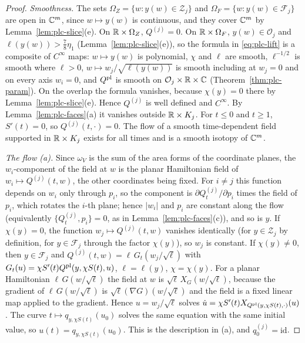 \begin{proof}
\emph{Smoothness.} The sets $\Omega_Z=\{w:y(w)\in\mathcal Z_j\}$ and $\Omega_F=\{w:y(w)\in\mathcal F_j\}$ are open in $\mathbb{C}^m$, since
$w\mapsto y(w)$ is continuous, and they cover $\mathbb{C}^m$ by Lemma~\ref{lem:plc-slice}(e). On $\mathbb{R}\times\Omega_Z$, $Q^{(j)}=0$. On $\mathbb{R}\times\Omega_F$,
$y(w)\in\mathcal O_j$ and $\ell(y(w))>\frac78\eta_1$ (Lemma~\ref{lem:plc-slice}(e)), so the formula in \eqref{eq:plc-lift} is a composite
of $C^\infty$ maps: $w\mapsto y(w)$ is polynomial, $\chi$ and $\ell$ are smooth, $\ell^{-1/2}$ is smooth where $\ell>0$,
$w\mapsto w_j/\sqrt{\ell(y(w))}$ is smooth including at $w_j=0$ and on every axis $w_i=0$, and $Q^{\rm pl}$ is smooth on
$\mathcal O_j\times\mathbb{R}\times\mathbb{C}$ (Theorem~\ref{thm:plc-param}). On the overlap the formula vanishes, because $\chi(y)=0$ there by
Lemma~\ref{lem:plc-slice}(e). Hence $Q^{(j)}$ is well defined and $C^\infty$. By Lemma~\ref{lem:plc-faces}(a) it vanishes outside
$\mathbb{R}\times K_j$. For $t\le0$ and $t\ge1$, $S'(t)=0$, so $Q^{(j)}(t,\cdot)=0$. The flow of a smooth time-dependent field supported in
$\mathbb{R}\times K_j$ exists for all times and is a smooth isotopy of $\mathbb{C}^m$.

\emph{The flow (a).} Since $\omega_V$ is the sum of the area forms of the coordinate planes, the $w_i$-component of the
field at $w$ is the planar Hamiltonian field of $w_i\mapsto Q^{(j)}(t,w)$, the other coordinates being fixed. For $i\ne j$ this
function depends on $w_i$ only through $p_i$, so the component is $\partial Q^{(j)}_t/\partial p_i$ times the field of $p_i$, which
rotates the $i$-th plane; hence $|w_i|$ and $p_i$ are constant along the flow (equivalently $\{Q^{(j)}_t,p_i\}=0$, as in
Lemma~\ref{lem:plc-faces}(c)), and so is $y$. If $\chi(y)=0$, the function $w_j\mapsto Q^{(j)}(t,w)$ vanishes identically (for $y\in\mathcal Z_j$
by definition, for $y\in\mathcal F_j$ through the factor $\chi(y)$), so $w_j$ is constant. If $\chi(y)\ne0$, then $y\in\mathcal F_j$ and
$Q^{(j)}(t,w)=\ell\,G_t(w_j/\sqrt\ell)$ with $G_t(u)=\chi S'(t)Q^{\rm pl}(y,\chi S(t),u)$, $\ell=\ell(y)$, $\chi=\chi(y)$. For a planar Hamiltonian
$\ell\,G(w/\sqrt\ell)$ the field at $w$ is $\sqrt\ell\,X_G(w/\sqrt\ell)$, because the gradient of $\ell\,G(w/\sqrt\ell)$ is $\sqrt\ell(\nabla G)(w/\sqrt\ell)$
and the field is a fixed linear map applied to the gradient. Hence $u=w_j/\sqrt\ell$ solves
$\dot u=\chi S'(t)X_{Q^{\rm pl}(y,\chi S(t),\cdot)}(u)$. The curve $t\mapsto q_{y,\chi S(t)}(u_0)$ solves the same equation with the same initial
value, so $u(t)=q_{y,\chi S(t)}(u_0)$. This is the description in (a), and $q^{(j)}_0=\mathrm{id}$.


\end{proof}

